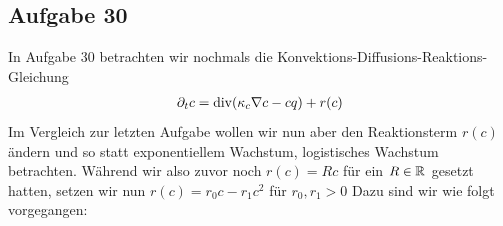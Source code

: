 \subsection{Aufgabe 30}
In Aufgabe 30 betrachten wir nochmals die Konvektions-Diffusions-Reaktions-Gleichung 
\begin{align*}
	\partial_t c = \operatorname{div} ( \kappa_c \nabla c - cq) + r(c) 
\end{align*}
Im Vergleich zur letzten Aufgabe wollen wir nun aber den Reaktionsterm $r(c)$ ändern und so statt exponentiellem Wachstum, logistisches Wachstum betrachten. Während wir also zuvor noch $r(c) = Rc$ für ein $R \in \mathbb{R}$ gesetzt hatten, setzen wir nun $r(c) = r_0 c - r_1 c^2$ für $r_0,r_1 > 0$
\newline
Dazu sind wir wie folgt vorgegangen:
 

 \begin{figure}[H]
 		\centering
 \end{figure}

